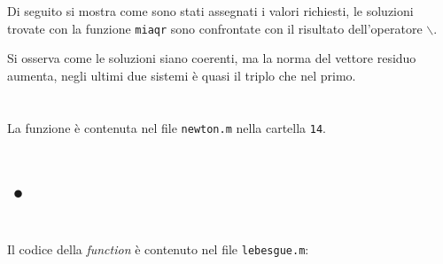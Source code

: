 \documentclass[10pt,a4paper]{article}
\begin{document}
\section{}
Di seguito si mostra come sono stati assegnati i valori richiesti, le soluzioni trovate con la funzione \texttt{miaqr} sono confrontate con il risultato dell'operatore \texttt{$\backslash$}.

Si osserva come le soluzioni siano coerenti, ma la norma del vettore residuo aumenta, negli ultimi due sistemi è quasi il triplo che nel primo.\\
\section{}
La funzione è contenuta nel file \texttt{newton.m} nella cartella \texttt{14}.
\section{•}
\section{}

\section{}
\section{}
\section{}
\section{}
Il codice della \textit{function} è contenuto nel file \texttt{lebesgue.m}:\\

\end{document}
